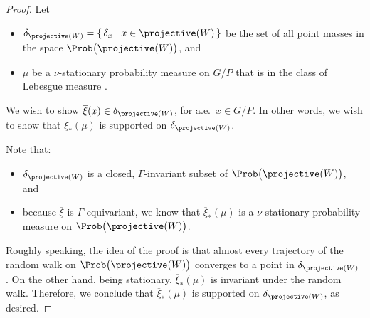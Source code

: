 \begin{proof}
Let 
	\begin{itemize}
	\item $\delta_{\projective(W)} = \{\, \delta_{x} \mid x \in \projective(W)\,\}$
		be the set of all point masses in the space $\Prob \bigl( \projective(W) \bigr)$,
	and
	\item $\mu$ be a $\nu$-stationary probability measure on $G/P$ that is in the class of Lebesgue measure .
	\end{itemize}
We wish to show $\overline{\xi}(x) \in \delta_{\projective(W)}$, for a.e.\ $x \in G/P$. In other words, we wish to show that $\overline{\xi}_*(\mu)$ is supported on $\delta_{\projective(W)}$.

Note that:
	\begin{itemize}
	\item $\delta_{\projective(W)}$ is a closed, $\Gamma$-invariant subset of $\Prob \bigl( \projective(W) \bigr)$,
	and
	\item because $\overline{\xi}$ is $\Gamma$-equivariant, we know that $\overline{\xi}_*(\mu)$ is a $\nu$-stationary probability measure on $\Prob \bigl( \projective(W) \bigr)$. 
	\end{itemize}

Roughly speaking, the idea of the proof is that almost every trajectory of the random walk on $\Prob \bigl( \projective(W) \bigr)$ converges to a point in $\delta_{\projective(W)}$ . On the other hand, being stationary, $\overline{\xi}_*(\mu)$ is invariant under the random walk. Therefore, we conclude that $\overline{\xi}_*(\mu)$ is supported on $\delta_{\projective(W)}$, as desired. 


\end{proof}
